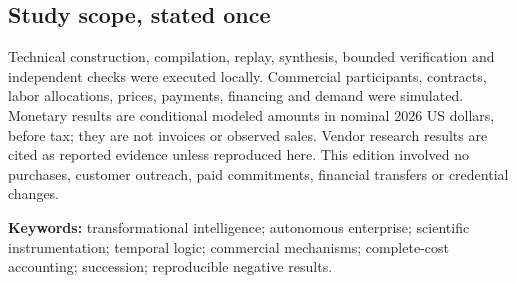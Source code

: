 \documentclass[11pt,letterpaper]{article}
\begin{document}
\subsection*{Study scope, stated once}
Technical construction, compilation, replay, synthesis, bounded verification and independent checks were executed locally. Commercial participants, contracts, labor allocations, prices, payments, financing and demand were simulated. Monetary results are conditional modeled amounts in nominal 2026 US dollars, before tax; they are not invoices or observed sales. Vendor research results are cited as reported evidence unless reproduced here. This edition involved no purchases, customer outreach, paid commitments, financial transfers or credential changes.

\textbf{Keywords:} transformational intelligence; autonomous enterprise; scientific instrumentation; temporal logic; commercial mechanisms; complete-cost accounting; succession; reproducible negative results.
\newpage
\tableofcontents
\newpage



\appendix


\end{document}
